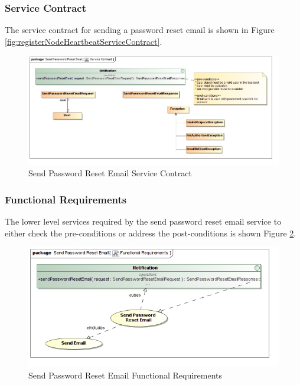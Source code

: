 \subsubsection{Service Contract}
The service contract for sending a password reset email is shown in 
Figure \ref{fig:registerNodeHeartbeatServiceContract}.
\begin{figure}[H]
	\begin{center}
		\includegraphics[scale=0.38]{../Diagrams and Charts/Notifications/Send Password Reset Email Service Contract.jpg}
		\caption{Send Password Reset Email Service Contract}
		\label{fig:sendPasswordResetMailServiceContract}
	\end{center}
\end{figure}

\subsubsection{Functional Requirements}
The lower level services required by the send password reset email service to 
either check the pre-conditions or address the post-conditions is shown 
Figure \ref{fig:sendPasswordMailFunctionalRequirements}.
\begin{figure}[H]
	\begin{center}
		\includegraphics[scale=0.38]{../Diagrams and Charts/Notifications/Send Password Reset Email Functional Requirements.jpg}
		\caption{Send Password Reset Email Functional Requirements}
	  \label{fig:sendPasswordMailFunctionalRequirements}
	\end{center}
\end{figure}


